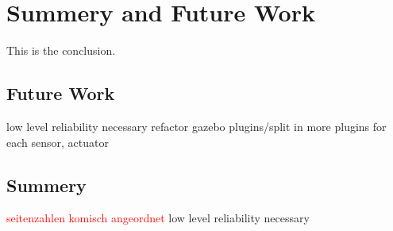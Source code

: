 \chapter{Summery and Future Work}
\label{cha:summery_and_future_work}

This is the conclusion.

\section{Future Work}

low level reliability necessary
refactor gazebo plugins/split in more plugins for each sensor, actuator

\section{Summery}

\textcolor{red}{seitenzahlen komisch angeordnet}
low level reliability necessary
